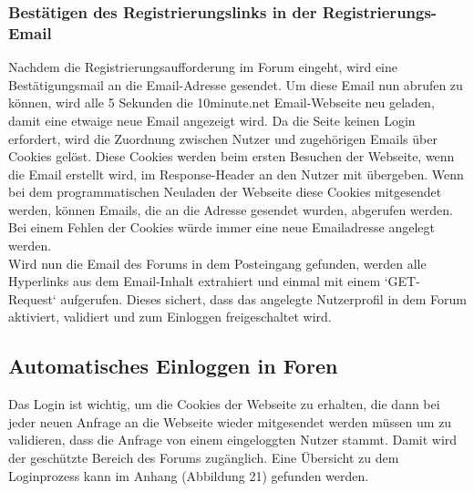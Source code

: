 \subsubsection{Bestätigen des Registrierungslinks in der Registrierungs-Email}
Nachdem die Registrierungsaufforderung im Forum eingeht, wird eine Bestätigungsmail an die Email-Adresse gesendet.
Um diese Email nun abrufen zu können, wird alle 5 Sekunden die 10minute.net Email-Webseite neu geladen, damit eine etwaige neue Email angezeigt wird. Da die Seite keinen Login erfordert, wird die Zuordnung zwischen Nutzer und zugehörigen Emails über Cookies gelöst. Diese Cookies werden beim ersten Besuchen der Webseite, wenn die Email erstellt wird, im Response-Header an den Nutzer mit übergeben. Wenn bei dem programmatischen Neuladen der Webseite diese Cookies mitgesendet werden, können Emails, die an die Adresse gesendet wurden, abgerufen werden. Bei einem Fehlen der Cookies würde immer eine neue Emailadresse angelegt werden.\\
Wird nun die Email des Forums in dem Posteingang gefunden, werden alle Hyperlinks aus dem Email-Inhalt extrahiert und einmal mit einem `GET-Request` aufgerufen. Dieses sichert, dass das angelegte Nutzerprofil in dem Forum aktiviert, validiert und zum Einloggen freigeschaltet wird.


\subsection {Automatisches Einloggen in Foren}
Das Login ist wichtig, um die Cookies der Webseite zu erhalten, die dann bei jeder neuen Anfrage an die Webseite wieder mitgesendet werden müssen um zu validieren, dass die Anfrage von einem eingeloggten Nutzer stammt. Damit wird der geschützte Bereich des Forums zugänglich.
Eine Übersicht zu dem Loginprozess kann im Anhang (Abbildung 21) gefunden werden.

